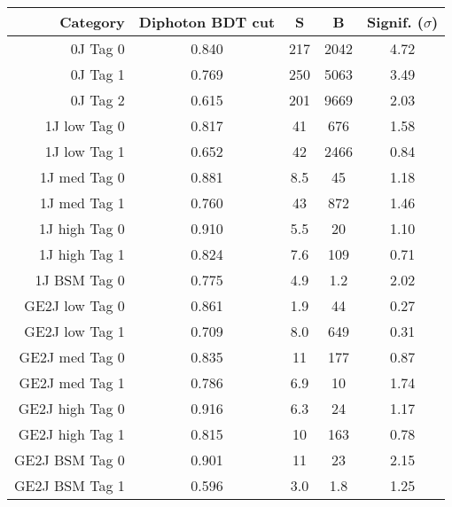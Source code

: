 \begin{tabular}{ r | c | c | c | c } 
\hline 
Category         & Diphoton BDT cut & S      & B          & Signif. ($\sigma$) \\
\hline 
0J Tag 0         & 0.840            & 217    & 2042       & 4.72                    \\
0J Tag 1         & 0.769            & 250    & 5063       & 3.49                    \\
0J Tag 2         & 0.615            & 201    & 9669       & 2.03                    \\
\hline                                                                              
1J low  Tag 0    & 0.817            & 41     & 676        & 1.58                    \\
1J low  Tag 1    & 0.652            & 42     & 2466       & 0.84                    \\
1J med  Tag 0    & 0.881            & 8.5    & 45         & 1.18                    \\
1J med  Tag 1    & 0.760            & 43     & 872        & 1.46                    \\
1J high Tag 0    & 0.910            & 5.5    & 20         & 1.10                    \\
1J high Tag 1    & 0.824            & 7.6    & 109        & 0.71                    \\
1J BSM  Tag 0    & 0.775            & 4.9    & 1.2        & 2.02                    \\
\hline                                                                              
GE2J low  Tag 0  & 0.861            & 1.9    & 44         & 0.27                    \\
GE2J low  Tag 1  & 0.709            & 8.0    & 649        & 0.31                    \\
GE2J med  Tag 0  & 0.835            & 11     & 177        & 0.87                    \\
GE2J med  Tag 1  & 0.786            & 6.9    & 10         & 1.74                    \\
GE2J high Tag 0  & 0.916            & 6.3    & 24         & 1.17                    \\
GE2J high Tag 1  & 0.815            & 10     & 163        & 0.78                    \\
GE2J BSM  Tag 0  & 0.901            & 11     & 23         & 2.15                    \\
GE2J BSM  Tag 1  & 0.596            & 3.0    & 1.8        & 1.25                    \\
\hline 
\end{tabular}
